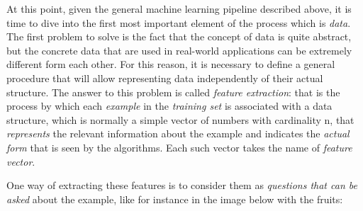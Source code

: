 At this point, given the general machine learning pipeline described
above, it is time to dive into the first most important element of
the process which is \emph{data}. The first
problem to solve is the fact that the concept of data is quite abstract,
but the concrete data that are used in real-world applications can be
extremely different form each other. For this reason, it is necessary to
define a general procedure that will allow representing data
independently of their actual structure. The answer to this problem is
called \emph{feature extraction}: that is the process by which each
\emph{example} in the \emph{training set} is associated with a data
structure, which is normally a simple vector of numbers with cardinality
n, that \emph{represents} the relevant information about the example and
indicates the \emph{actual form} that is seen by the algorithms. Each
such vector takes the name of \emph{feature vector}.

\newpage

One way of extracting these features is to consider them as
\emph{questions that can be asked} about the example, like for instance
in the image below with the fruits:

\vspace{5mm}

